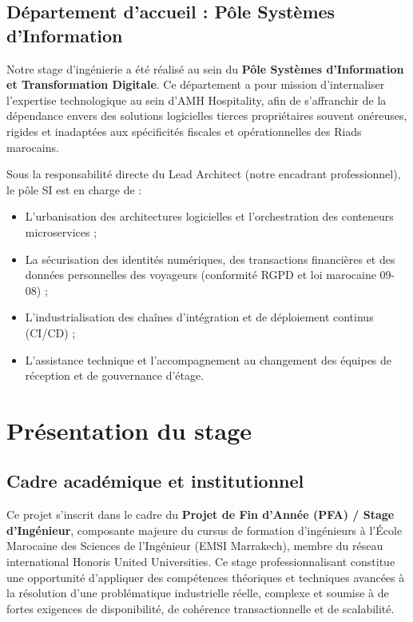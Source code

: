 \documentclass[12pt,a4paper,oneside]{report}
\begin{document}
\subsection{Département d'accueil : Pôle Systèmes d'Information}

Notre stage d'ingénierie a été réalisé au sein du \textbf{Pôle Systèmes d'Information et Transformation Digitale}. Ce département a pour mission d'internaliser l'expertise technologique au sein d'AMH Hospitality, afin de s'affranchir de la dépendance envers des solutions logicielles tierces propriétaires souvent onéreuses, rigides et inadaptées aux spécificités fiscales et opérationnelles des Riads marocains.

Sous la responsabilité directe du Lead Architect (notre encadrant professionnel), le pôle SI est en charge de :
\begin{itemize}
    \item L'urbanisation des architectures logicielles et l'orchestration des conteneurs microservices ;
    \item La sécurisation des identités numériques, des transactions financières et des données personnelles des voyageurs (conformité RGPD et loi marocaine 09-08) ;
    \item L'industrialisation des chaînes d'intégration et de déploiement continus (CI/CD) ;
    \item L'assistance technique et l'accompagnement au changement des équipes de réception et de gouvernance d'étage.
\end{itemize}

\section{Présentation du stage}

\subsection{Cadre académique et institutionnel}

Ce projet s'inscrit dans le cadre du \textbf{Projet de Fin d'Année (PFA) / Stage d'Ingénieur}, composante majeure du cursus de formation d'ingénieurs à l'École Marocaine des Sciences de l'Ingénieur (EMSI Marrakech), membre du réseau international Honoris United Universities. Ce stage professionnalisant constitue une opportunité d'appliquer des compétences théoriques et techniques avancées à la résolution d'une problématique industrielle réelle, complexe et soumise à de fortes exigences de disponibilité, de cohérence transactionnelle et de scalabilité.
\end{document}
